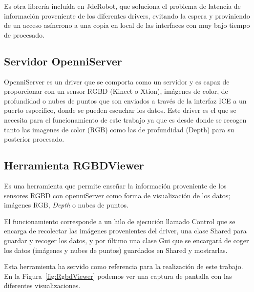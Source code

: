 Es otra librería incluída en JdeRobot, que soluciona el problema de latencia de información proveniente de los diferentes drivers, evitando la espera y proviniendo de un acceso asíncrono a una copia en local de las interfaces con muy bajo tiempo de procesado.

\subsection{Servidor OpenniServer}

OpenniServer es un driver que se comporta como un servidor y es capaz de proporcionar con un sensor RGBD (Kinect o Xtion), imágenes de color, de profundidad o nubes de puntos que son enviados a través de la interfaz ICE a un puerto específico, donde se pueden escuchar los datos. Este driver es el que se necesita para el funcionamiento de este trabajo ya que es desde donde se recogen tanto las imagenes de color (RGB) como las de profundidad (Depth) para su posterior procesado.

\subsection{Herramienta RGBDViewer}

Es una herramienta que permite enseñar la información proveniente de los sensores RGBD con openniServer como forma de visualización de los datos; imágenes RGB, \textit{Depth} o nubes de puntos.

El funcionamiento corresponde a un hilo de ejecución llamado Control que se encarga de recolectar las imágenes provenientes del driver, una clase Shared para guardar y recoger los datos, y por último una clase Gui que se encargará de coger los datos (imágenes y nubes de puntos) guardados en Shared y mostrarlas.


Esta herramienta ha servido como referencia para la realización de este trabajo. En la Figura~\ref{fig:RgbdViewer} podemos ver una captura de pantalla con las diferentes visualizaciones. 

